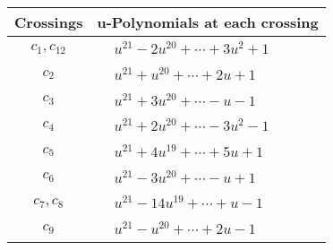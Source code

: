 \documentclass[1p]{elsarticle_modified}
\theoremstyle{definition}
\begin{document}
\begin{tabular}{m{50pt}|m{274pt}}
Crossings & \hspace{64pt}u-Polynomials at each crossing \\
\hline $$\begin{aligned}c_{1},c_{12}\end{aligned}$$&$\begin{aligned}
&u^{21}-2 u^{20}+\cdots+3 u^2+1
\end{aligned}$\\
\hline $$\begin{aligned}c_{2}\end{aligned}$$&$\begin{aligned}
&u^{21}+u^{20}+\cdots+2 u+1
\end{aligned}$\\
\hline $$\begin{aligned}c_{3}\end{aligned}$$&$\begin{aligned}
&u^{21}+3 u^{20}+\cdots- u-1
\end{aligned}$\\
\hline $$\begin{aligned}c_{4}\end{aligned}$$&$\begin{aligned}
&u^{21}+2 u^{20}+\cdots-3 u^2-1
\end{aligned}$\\
\hline $$\begin{aligned}c_{5}\end{aligned}$$&$\begin{aligned}
&u^{21}+4 u^{19}+\cdots+5 u+1
\end{aligned}$\\
\hline $$\begin{aligned}c_{6}\end{aligned}$$&$\begin{aligned}
&u^{21}-3 u^{20}+\cdots- u+1
\end{aligned}$\\
\hline $$\begin{aligned}c_{7},c_{8}\end{aligned}$$&$\begin{aligned}
&u^{21}-14 u^{19}+\cdots+u-1
\end{aligned}$\\
\hline $$\begin{aligned}c_{9}\end{aligned}$$&$\begin{aligned}
&u^{21}- u^{20}+\cdots+2 u-1
\end{aligned}$\\

\end{tabular}
\end{document}
